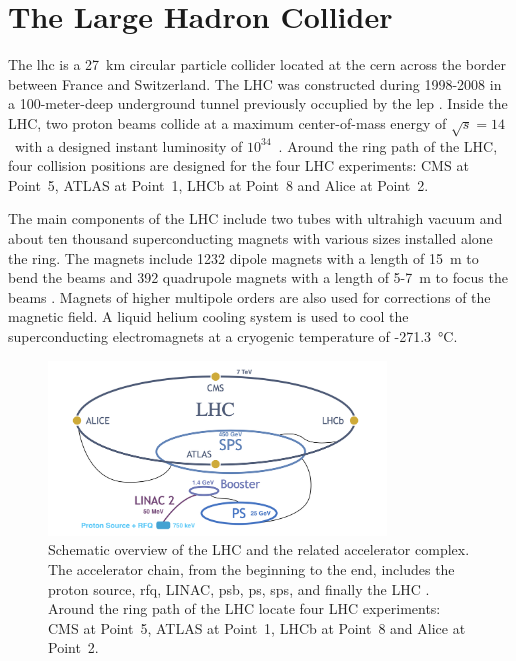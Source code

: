 
\section{The Large Hadron Collider}
\label{sec:cmsexperiment:lhc}

The \acrfull{lhc} \cite{exhep:lhc:Evans:2008zzb} is a 27~km circular particle collider located at the \acrfull{cern} across the border between France and Switzerland. The LHC was constructed during 1998-2008 in a 100-meter-deep underground tunnel previously occuplied by the \acrfull{lep} \cite{exhep:lep:Myers:1991ym}. Inside the LHC, two proton beams collide at a maximum center-of-mass energy of $\sqrt{s}=14$~\TeV with a designed instant luminosity of $10^{34}$~\percms. Around the ring path of the LHC, four collision positions are designed for the four LHC experiments: CMS \cite{exhep:cms:Chatrchyan:2008aa} at Point~5, ATLAS \cite{exhep:atlas:Aad:2008zzm} at Point~1, LHCb \cite{exhep:lhcb:Alves:2008zz} at Point~8 and Alice \cite{exhep:alice:Aamodt:2008zz} at Point~2.


The main components of the LHC include two tubes with ultrahigh vacuum and about ten thousand superconducting magnets with various sizes installed alone the ring. The magnets include 1232 dipole magnets with a length of 15~m to bend the beams and 392 quadrupole magnets with a length of 5-7~m to focus the beams \cite{exhep:lhcFactsFigures}. Magnets of higher multipole orders are also used for corrections of the magnetic field. A liquid helium cooling system is used to cool the superconducting electromagnets at a cryogenic temperature of -271.3~\si{\degreeCelsius}. 


\begin{figure}[ht]
    \centering
    \includegraphics[width=0.8\textwidth]{chapters/CMSExperiment/sectionLHC/figures/lhc.png}
    \caption{Schematic overview of the LHC and the related accelerator complex. The accelerator chain, from the beginning to the end, includes the proton source, \acrfull{rfq}, LINAC, \acrfull{psb}, \acrfull{ps}, \acrfull{sps}, and finally the LHC \cite{exhep:lhcInject:Benedikt:2004wm}. Around the ring path of the LHC locate four LHC experiments: CMS \cite{exhep:cms:Chatrchyan:2008aa} at Point~5, ATLAS \cite{exhep:atlas:Aad:2008zzm} at Point~1, LHCb \cite{exhep:lhcb:Alves:2008zz} at Point~8 and Alice \cite{exhep:alice:Aamodt:2008zz} at Point~2.}
    \label{fig:cmsexperiment:lhc:map}
\end{figure}

